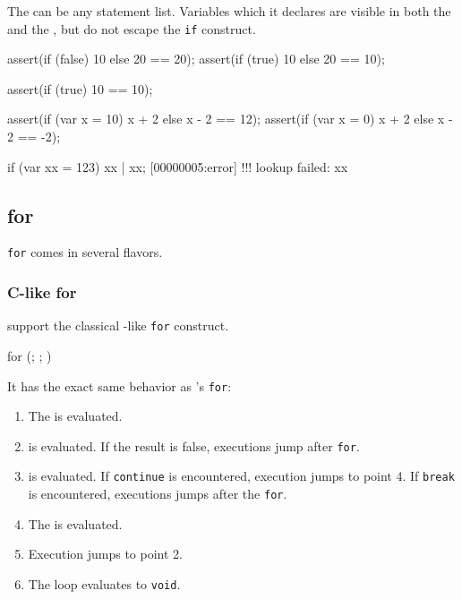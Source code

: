 The  can be any statement list.  Variables which it
declares are visible in both the  and the
, but do not escape the \lstinline|if| construct.

\begin{urbiscript}[firstnumber=last]
assert({if (false) 10 else 20} == 20);
assert({if (true)  10 else 20} == 10);

assert({if (true) 10         } == 10);

assert({if (var x = 10) x + 2 else x - 2} == 12);
assert({if (var x = 0)  x + 2 else x - 2} == -2);

if (var xx = 123) xx | xx;
[00000005:error] !!! lookup failed: xx
\end{urbiscript}

\subsection{for}
\label{sec:lang:for}
\lstinline|for| comes in several flavors.

\subsubsection{C-like for}

\us support the classical \C-like \lstinline|for| construct.

\begin{urbiunchecked}
for (; ; )
\end{urbiunchecked}

It has the exact same behavior as \C's \lstinline|for|:

\begin{enumerate}
\item The  is evaluated.
\item {} is evaluated. If the result is false, executions
  jump after \lstinline|for|.
\item {} is evaluated. If \lstinline|continue| is encountered,
  execution jumps to point 4. If \lstinline|break| is encountered,
  executions jumps after the \lstinline|for|.
\item The  is evaluated.
\item Execution jumps to point 2.
\item The loop evaluates to \lstinline|void|.
\end{enumerate}

